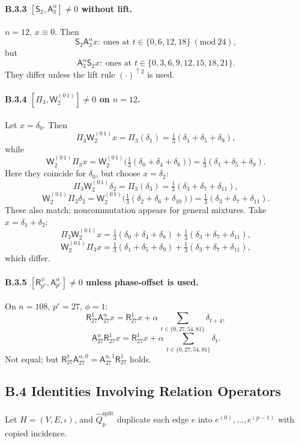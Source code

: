 \documentclass[12pt]{article}
\numberwithin{equation}{section}
\theoremstyle{plain}
\theoremstyle{definition}
\theoremstyle{remark}
\begin{document}
\paragraph{B.3.3 \([\mathsf{S}_2,\mathsf{A}_3^{\alpha}]\neq 0\) without lift.}
$n=12$, $x\equiv 0$. Then
\[
\mathsf{S}_2\mathsf{A}_3^{\alpha}x:\ \text{ones at } t\in\{0,6,12,18\}\ (\mathrm{mod}\ 24),
\]
but
\[
\mathsf{A}_3^{\alpha}\mathsf{S}_2 x:\ \text{ones at } t\in\{0,3,6,9,12,15,18,21\}.
\]
They differ unless the lift rule $(\cdot)^{\uparrow 2}$ is used.

\paragraph{B.3.4 \([\Pi_{3},\mathsf{W}_2^{(0\,1)}]\neq 0\) on $n=12$.}
Let $x=\delta_0$. Then
\[
\Pi_{3}\mathsf{W}_2^{(0\,1)}x=\Pi_{3}(\delta_1)=\tfrac{1}{3}(\delta_1+\delta_5+\delta_9),
\]
while
\[
\mathsf{W}_2^{(0\,1)}\Pi_{3}x=\mathsf{W}_2^{(0\,1)}\big(\tfrac{1}{3}(\delta_0+\delta_4+\delta_8)\big)=\tfrac{1}{3}(\delta_1+\delta_5+\delta_9).
\]
Here they coincide for $\delta_0$, but choose $x=\delta_2$:
\[
\Pi_{3}\mathsf{W}_2^{(0\,1)}\delta_2=\Pi_{3}(\delta_3)=\tfrac{1}{3}(\delta_3+\delta_7+\delta_{11}),
\]
\[
\mathsf{W}_2^{(0\,1)}\Pi_{3}\delta_2=\mathsf{W}_2^{(0\,1)}\big(\tfrac{1}{3}(\delta_2+\delta_6+\delta_{10})\big)=\tfrac{1}{3}(\delta_3+\delta_7+\delta_{11}).
\]
These also match; noncommutation appears for general mixtures. Take $x=\delta_1+\delta_2$:
\[
\Pi_{3}\mathsf{W}_2^{(0\,1)}x=\tfrac{1}{3}(\delta_0+\delta_4+\delta_8)+\tfrac{1}{3}(\delta_3+\delta_7+\delta_{11}),
\]
\[
\mathsf{W}_2^{(0\,1)}\Pi_{3}x=\tfrac{1}{3}(\delta_1+\delta_5+\delta_9)+\tfrac{1}{3}(\delta_3+\delta_7+\delta_{11}),
\]
which differ.

\paragraph{B.3.5 \([\mathsf{R}_{p^r}^{\phi},\mathsf{A}_{p^r}^{\alpha}]\neq 0\) unless phase-offset is used.}
On $n=108$, $p^r=27$, $\phi=1$:
\[
\mathsf{R}_{27}^{1}\mathsf{A}_{27}^{\alpha}x= \mathsf{R}_{27}^{1}x+\alpha\,\sum_{t\in\{0,27,54,81\}}\delta_{t+4},
\]
\[
\mathsf{A}_{27}^{\alpha}\mathsf{R}_{27}^{1}x= \mathsf{R}_{27}^{1}x+\alpha\,\sum_{t\in\{0,27,54,81\}}\delta_{t}.
\]
Not equal; but $\mathsf{R}_{27}^{1}\mathsf{A}_{27}^{\alpha,0}=\mathsf{A}_{27}^{\alpha,1}\mathsf{R}_{27}^{1}$ holds.

\subsection*{B.4 Identities Involving Relation Operators}
Let $H=(V,E,\iota)$, and $\hat{Q}_p^{\mathrm{split}}$ duplicate each edge $e$ into $e^{(0)},\dots,e^{(p-1)}$ with copied incidence.
\end{document}
